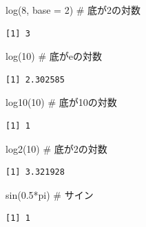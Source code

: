 \documentclass[
  letterpaper,
  DIV=11,
  numbers=noendperiod]{scrreprt}
\newenvironment{Shaded}{\begin{snugshade}}{\end{snugshade}}
\newcommand{\AttributeTok}[1]{\textcolor[rgb]{0.40,0.45,0.13}{#1}}
\newcommand{\CommentTok}[1]{\textcolor[rgb]{0.37,0.37,0.37}{#1}}
\newcommand{\DecValTok}[1]{\textcolor[rgb]{0.68,0.00,0.00}{#1}}
\newcommand{\FloatTok}[1]{\textcolor[rgb]{0.68,0.00,0.00}{#1}}
\newcommand{\FunctionTok}[1]{\textcolor[rgb]{0.28,0.35,0.67}{#1}}
\newcommand{\NormalTok}[1]{\textcolor[rgb]{0.00,0.23,0.31}{#1}}
\newcommand{\SpecialCharTok}[1]{\textcolor[rgb]{0.37,0.37,0.37}{#1}}
\begin{document}
\begin{Shaded}
\begin{Highlighting}[]
\FunctionTok{log}\NormalTok{(}\DecValTok{8}\NormalTok{, }\AttributeTok{base =} \DecValTok{2}\NormalTok{) }\CommentTok{\# 底が2の対数}
\end{Highlighting}
\end{Shaded}

\begin{verbatim}
[1] 3
\end{verbatim}

\begin{Shaded}
\begin{Highlighting}[]
\FunctionTok{log}\NormalTok{(}\DecValTok{10}\NormalTok{) }\CommentTok{\# 底がeの対数}
\end{Highlighting}
\end{Shaded}

\begin{verbatim}
[1] 2.302585
\end{verbatim}

\begin{Shaded}
\begin{Highlighting}[]
\FunctionTok{log10}\NormalTok{(}\DecValTok{10}\NormalTok{) }\CommentTok{\# 底が10の対数}
\end{Highlighting}
\end{Shaded}

\begin{verbatim}
[1] 1
\end{verbatim}

\begin{Shaded}
\begin{Highlighting}[]
\FunctionTok{log2}\NormalTok{(}\DecValTok{10}\NormalTok{) }\CommentTok{\# 底が2の対数}
\end{Highlighting}
\end{Shaded}

\begin{verbatim}
[1] 3.321928
\end{verbatim}

\begin{Shaded}
\begin{Highlighting}[]
\FunctionTok{sin}\NormalTok{(}\FloatTok{0.5}\SpecialCharTok{*}\NormalTok{pi) }\CommentTok{\# サイン}
\end{Highlighting}
\end{Shaded}

\begin{verbatim}
[1] 1
\end{verbatim}
\end{document}
